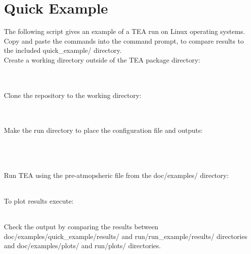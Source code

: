{ 

\section{Quick Example}
\label{quickExample}

The following script gives an example of a TEA run on Linux operating
systems. Copy and paste the commands into the command prompt, 
to compare results to the included quick\_example/ directory.\\

\noindent Create a working directory outside of the TEA package directory:

\\
\\

\noindent Clone the repository to the working directory:

\\
\\


\noindent Make the run directory to place the configuration file and outputs:

\\
\\
\\

\noindent Run TEA using the pre-atmopsheric file from the doc/examples/ directory:

\\

\noindent To plot results execute:

\\

\noindent Check the output by comparing the results between
doc/examples/quick\_example/results/ and \newline 
run/run\_example/results/ directories
and doc/examples/plots/ and run/plots/ directories.





}
